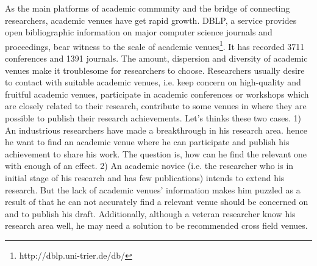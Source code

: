 \documentclass[9pt]{acm_proc_article-sp}
\begin{document}
As the main platforms of academic community and the bridge of connecting researchers, academic venues have get rapid growth. DBLP, a service provides open bibliographic information on major computer science journals and proceedings, bear witness to the scale of academic venues\footnote{http://dblp.uni-trier.de/db/}. It has recorded 3711 conferences and 1391 journals. The amount, dispersion and diversity of academic venues make it troublesome for researchers to choose. Researchers usually desire to contact with suitable academic venues, i.e. keep concern on high-quality and fruitful academic venues, participate in academic conferences or workshops which are closely related to their research, contribute to some venues in where they are possible to publish their research achievements. Let's thinks these two cases. 1) An industrious researchers have made a breakthrough in his research area. hence he want to find an academic venue where he can participate and publish his achievement to share his work. The question is, how can he find the relevant one with enough of an effect. 2) An academic novice (i.e. the researcher who is in initial stage of his research and has few publications) intends to extend his research. But the lack of academic venues' information makes him puzzled as a result of that he can not accurately find a relevant venue should be concerned on and to publish his draft. Additionally, although a veteran researcher know his research area well, he may need a solution to be recommended cross field venues.
\end{document}
